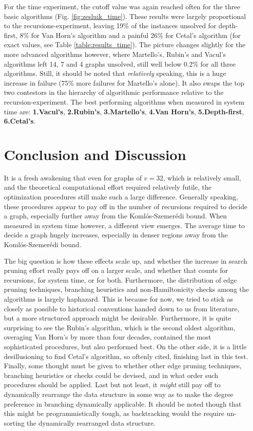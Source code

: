 \documentclass[10pt,conference,compsocconf]{IEEEtran}
\begin{document}
For the time experiment, the cutoff value was again reached often for the three basic algorithms (Fig. \ref{fig:zesluik_time}). These results were largely proportional to the recursions-experiment, leaving 19\% of the instances unsolved for depth-first, 8\% for Van Horn's algorithm and a painful 26\% for Cetal's algorithm (for exact values, see Table \ref{table:results_time}). The picture changes slightly for the more advanced algorithms however, where Martello's, Rubin's and Vacul's algorithms left 14, 7 and 4 graphs unsolved, still well below 0.2\% for all three algorithms. Still, it should be noted that \textit{relatively} speaking, this is a huge increase in failure (75\% more failures for Martello's alone). It also swaps the top two contestors in the hierarchy of algorithmic performance relative to the recursion-experiment. The best performing algorithms when measured in system time are: \textbf{1.Vacul's}, \textbf{2.Rubin's}, \textbf{3.Martello's}, \textbf{4.Van Horn's}, \textbf{5.Depth-first}, \textbf{6.Cetal's}.


\section{Conclusion and Discussion}

\noindent It is a fresh awakening that even for graphs of $v=32$, which is relatively small, and the theoretical computational effort required relatively futile, the optimization procedures still make such a large difference. Generally speaking, these procedures appear to pay off in the number of recursions required to decide a graph, especially further away from the Koml\'os-Szemer\'edi bound. When measured in system time however, a different view emerges. The average time to decide a graph hugely increases, especially in denser regions away from the Koml\'os-Szemer\'edi bound.

The big question is how these effects scale up, and whether the increase in search pruning effort really pays off on a larger scale, and whether that counts for recursions, for system time, or for both. Furthermore, the distribution of edge pruning techniques, branching heuristics and non-Hamiltonicity checks among the algorithms is largely haphazard. This is because for now, we tried to stick as closely as possible to historical conventions handed down  to us from literature, but a more structured approach might be desirable. Furthermore, it is quite surprising to see the Rubin's algorithm, which is the second oldest algorithm, overaging Van Horn's by more than four decades, contained the most sophisticated procedures, but also performed best. On the other side, it is a little desillusioning to find Cetal's algorithm, so oftenly cited, finishing last in this test. Finally, some thought must be given to whether other edge pruning techniques, branching heuristics or checks could be devised, and in what order such procedures should be applied. Last but not least, it \textit{might} still pay off to dynamically rearrange the data structure in some way as to make the degree preference in branching dynamically applicable. It should be noted though that this might be programmistically tough, as backtracking would the require un-sorting the dynamically rearranged data structure.
\end{document}
